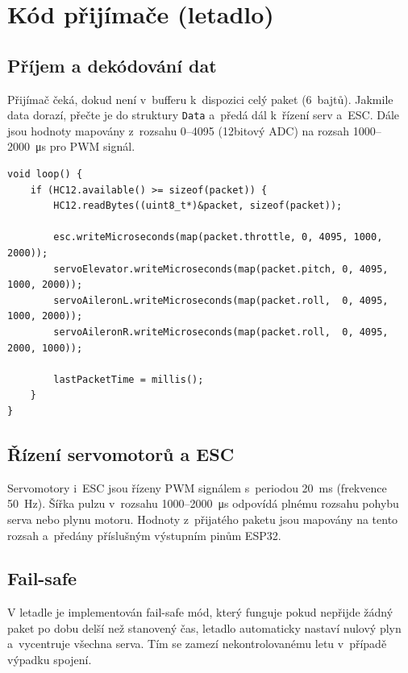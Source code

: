 \documentclass[12pt, a4paper, oneside]{report}
\begin{document}
\section{Kód přijímače (letadlo)}

\subsection{Příjem a dekódování dat}

Přijímač čeká, dokud není v~bufferu k~dispozici celý paket (6~bajtů).
Jakmile data dorazí, přečte je do struktury \texttt{Data}
a~předá dál k~řízení serv a~ESC. Dále jsou hodnoty mapovány 
z~rozsahu 0--4095 (12bitový ADC) na rozsah 1000--2000~\si{\micro\second} pro PWM signál.

\newpage

\begin{lstlisting}[style=c_style, caption={Příjem a řízení na straně letadla.}]
void loop() {
    if (HC12.available() >= sizeof(packet)) {
        HC12.readBytes((uint8_t*)&packet, sizeof(packet));

        esc.writeMicroseconds(map(packet.throttle, 0, 4095, 1000, 2000));
        servoElevator.writeMicroseconds(map(packet.pitch, 0, 4095, 1000, 2000));
        servoAileronL.writeMicroseconds(map(packet.roll,  0, 4095, 1000, 2000));
        servoAileronR.writeMicroseconds(map(packet.roll,  0, 4095, 2000, 1000));

        lastPacketTime = millis();
    }
}
\end{lstlisting}

\subsection{Řízení servomotorů a ESC}

Servomotory i~ESC jsou řízeny PWM signálem s~periodou 20~ms
(frekvence 50~Hz). Šířka pulzu v~rozsahu 1000--2000~\si{\micro\second}
odpovídá plnému rozsahu pohybu serva nebo plynu motoru.
Hodnoty z~přijatého paketu jsou mapovány na tento rozsah
a~předány příslušným výstupním pinům ESP32.

\subsection{Fail-safe}

V letadle je implementován fail-safe mód, který funguje pokud nepřijde
žádný paket po dobu delší než stanovený čas, letadlo automaticky
nastaví nulový plyn a~vycentruje všechna serva. Tím se zamezí nekontrolovanému
letu v~případě výpadku spojení.
\end{document}
